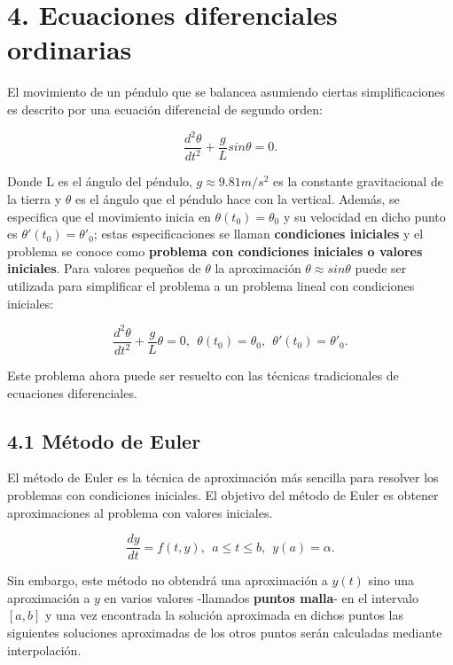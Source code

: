 \section*{4. Ecuaciones diferenciales ordinarias}

El movimiento de un péndulo que se balancea asumiendo ciertas simplificaciones es descrito por una ecuación diferencial de segundo orden:

\begin{equation*}
    \frac{d^2\theta}{d t^2} +\frac{g}{L}sin\theta=0.
\end{equation*}

Donde L es el ángulo del péndulo, $g\approx9.81 m/s^2$ es la constante gravitacional de la tierra y $\theta$ es el ángulo que el péndulo hace con la vertical. Además, se especifica que el movimiento inicia en  $\theta(t_0)=\theta_0$ y su velocidad en dicho punto es $\theta'(t_0)=\theta'_0$; estas especificaciones se llaman \textbf{condiciones iniciales} y el problema se conoce como \textbf{problema con condiciones iniciales o valores iniciales}. Para valores pequeños de $\theta$ la aproximación $\theta\approx sin\theta$ puede ser utilizada para simplificar el problema a un problema lineal con condiciones iniciales:

\begin{equation*}
    \frac{d^2\theta}{d t^2} +\frac{g}{L}\theta=0, \ \ \theta(t_0)=\theta_0, \ \ \theta'(t_0)=\theta'_0.
\end{equation*}

Este problema ahora puede ser resuelto con las técnicas tradicionales de ecuaciones diferenciales.

\subsection*{4.1 Método de Euler}

El método de Euler es la técnica de aproximación más sencilla para resolver los problemas con condiciones iniciales. El objetivo del método de Euler es obtener aproximaciones al problema con valores iniciales.

\begin{equation*}
    \frac{dy}{dt}=f(t,y), \ \ a\leq t\leq b, \ \ y(a)=\alpha.
\end{equation*}

Sin embargo, este método no obtendrá una aproximación a $y(t)$ sino una aproximación a $y$ en varios valores -llamados \textbf{puntos malla}- en el intervalo $[a,b]$ y una vez encontrada la solución aproximada en dichos puntos las siguientes soluciones aproximadas de los otros puntos serán calculadas mediante interpolación.

